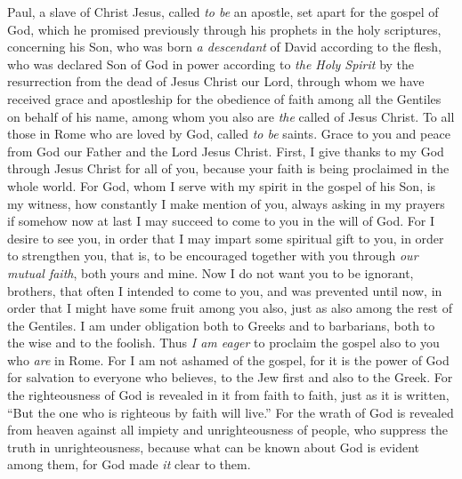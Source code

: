 
\begin{biblechapter} %
 Paul, a slave of Christ Jesus, called \textit{to be} an apostle, set apart for the gospel of God,
\verse which he promised previously through his prophets in the holy scriptures,
\verse concerning his Son, who was born \textit{a descendant} of David according to the flesh,
\verse who was declared Son of God in power according to \textit{the Holy Spirit} by the resurrection from the dead of Jesus Christ our Lord,
\verse through whom we have received grace and apostleship for the obedience of faith among all the Gentiles on behalf of his name,
\verse among whom you also are \textit{the} called of Jesus Christ.
\verse To all those in Rome who are loved by God, called \textit{to be} saints. Grace to you and peace from God our Father and the Lord Jesus Christ.
 First, I give thanks to my God through Jesus Christ for all of you, because your faith is being proclaimed in the whole world.
\verse For God, whom I serve with my spirit in the gospel of his Son, is my witness, how constantly I make mention of you,
\verse always asking in my prayers if somehow now at last I may succeed to come to you in the will of God.
\verse For I desire to see you, in order that I may impart some spiritual gift to you, in order to strengthen you,
\verse that is, to be encouraged together with you through \textit{our mutual faith}, both yours and mine.
\verse Now I do not want you to be ignorant, brothers, that often I intended to come to you, and was prevented until now, in order that I might have some fruit among you also, just as also among the rest of the Gentiles.
\verse I am under obligation both to Greeks and to barbarians, both to the wise and to the foolish.
\verse Thus \textit{I am eager} to proclaim the gospel also to you who \textit{are} in Rome.
 For I am not ashamed of the gospel, for it is the power of God for salvation to everyone who believes, to the Jew first and also to the Greek.
\verse For the righteousness of God is revealed in it from faith to faith, just as it is written, “But the one who is righteous by faith will live.”
 For the wrath of God is revealed from heaven against all impiety and unrighteousness of people, who suppress the truth in unrighteousness,
\verse because what can be known about God is evident among them, for God made \textit{it} clear to them.

\end{biblechapter}
